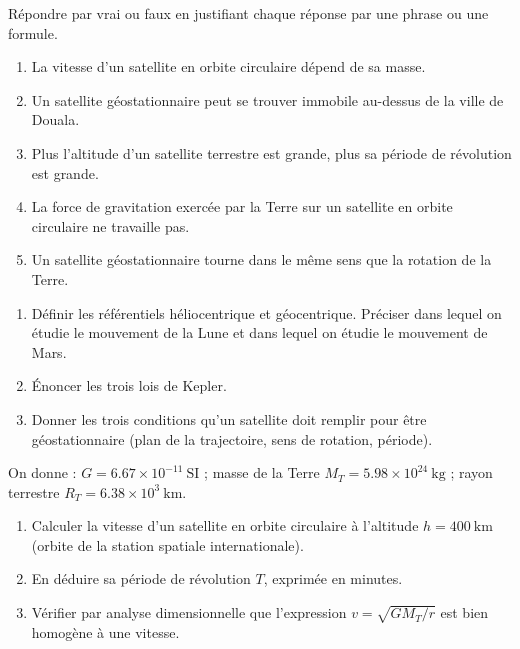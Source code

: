 \documentclass[11pt]{article}
\begin{document}
\begin{exercice}
Répondre par vrai ou faux en justifiant chaque réponse par une phrase ou une formule.
\begin{enumerate}
\item La vitesse d'un satellite en orbite circulaire dépend de sa masse.
\item Un satellite géostationnaire peut se trouver immobile au-dessus de la ville de Douala.
\item Plus l'altitude d'un satellite terrestre est grande, plus sa période de révolution est grande.
\item La force de gravitation exercée par la Terre sur un satellite en orbite circulaire ne travaille pas.
\item Un satellite géostationnaire tourne dans le même sens que la rotation de la Terre.
\end{enumerate}
\end{exercice}

\begin{exercice}
\begin{enumerate}
\item Définir les référentiels héliocentrique et géocentrique. Préciser dans lequel on étudie le mouvement de la Lune et dans lequel on étudie le mouvement de Mars.
\item Énoncer les trois lois de Kepler.
\item Donner les trois conditions qu'un satellite doit remplir pour être géostationnaire (plan de la trajectoire, sens de rotation, période).
\end{enumerate}
\end{exercice}

\begin{exercice}
On donne : $G = \num{6,67}\times 10^{-11}\ \mathrm{SI}$ ; masse de la Terre $M_T = \num{5,98}\times 10^{24}\ \mathrm{kg}$ ; rayon terrestre $R_T = \num{6,38}\times 10^{3}\ \mathrm{km}$.
\begin{enumerate}
\item Calculer la vitesse d'un satellite en orbite circulaire à l'altitude $h = \num{400}\ \mathrm{km}$ (orbite de la station spatiale internationale).
\item En déduire sa période de révolution $T$, exprimée en minutes.
\item Vérifier par analyse dimensionnelle que l'expression $v = \sqrt{GM_T/r}$ est bien homogène à une vitesse.
\end{enumerate}
\end{exercice}
\end{document}
